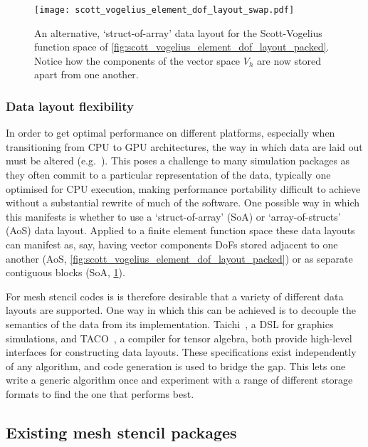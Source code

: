 \documentclass[thesis]{subfiles}
\begin{document}
\begin{figure}
  \centering
  \texttt{[image: scott\_vogelius\_element\_dof\_layout\_swap.pdf]}
  \caption{
    An alternative, `struct-of-array' data layout for the Scott-Vogelius function space of \cref{fig:scott_vogelius_element_dof_layout_packed}.
    Notice how the components of the vector space $V_h$ are now stored apart from one another.
  }
  \label{fig:scott_vogelius_element_dof_layout_swap}
\end{figure}

\subsubsection{Data layout flexibility}
\label{sec:intro_data_layout_flex}

In order to get optimal performance on different platforms, especially when transitioning from CPU to GPU architectures, the way in which data are laid out must be altered (e.g.~\cite{markallFiniteElementAssembly2013,sulyokImprovingLocalityUnstructured2018}).
This poses a challenge to many simulation packages as they often commit to a particular representation of the data, typically one optimised for CPU execution, making performance portability difficult to achieve without a substantial rewrite of much of the software.
One possible way in which this manifests is whether to use a `struct-of-array' (SoA) or `array-of-structs' (AoS) data layout.
Applied to a finite element function space these data layouts can manifest as, say, having vector components DoFs stored adjacent to one another (AoS, \cref{fig:scott_vogelius_element_dof_layout_packed}) or as separate contiguous blocks (SoA, \cref{fig:scott_vogelius_element_dof_layout_swap}).

For mesh stencil codes is is therefore desirable that a variety of different data layouts are supported.
One way in which this can be achieved is to decouple the semantics of the data from its implementation.
Taichi~\cite{huTaichiLanguageHighperformance2019}, a DSL for graphics simulations, and TACO~\cite{kjolstadTacoToolGenerate2017}, a compiler for tensor algebra, both provide high-level interfaces for constructing data layouts.
These specifications exist independently of any algorithm, and code generation is used to bridge the gap.
This lets one write a generic algorithm once and experiment with a range of different storage formats to find the one that performs best.

\subsection{Existing mesh stencil packages}
\label{sec:intro_existing_software}
\end{document}
